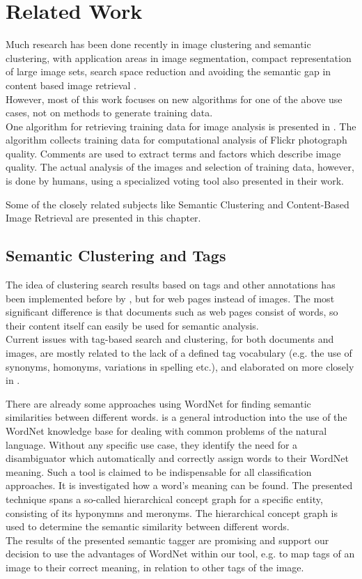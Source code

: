 \section{Related Work}
\label{sec_relatedwork}

Much research has been done recently in image clustering and semantic clustering, with application areas in image segmentation, compact representation of large image sets, search space reduction and avoiding the semantic gap in content based image retrieval \cite{Lim2011}. \\
However, most of this work focuses on new algorithms for one of the above use cases, not on methods to generate training data. \\

One algorithm for retrieving training data for image analysis is presented in \cite{Orendovici2010}. The algorithm collects training data for computational analysis of Flickr photograph quality. Comments are used to extract terms and factors which describe image quality. The actual analysis of the images and selection of training data, however, is done by humans, using a specialized voting tool also presented in their work.

\bigskip
Some of the closely related subjects like Semantic Clustering and Content-Based Image Retrieval are presented in this chapter.

\subsection{Semantic Clustering and Tags}
The idea of clustering search results based on tags and other annotations has been implemented before by \cite{Ramage2009}, but for web pages instead of images. The most significant difference is that documents such as web pages consist of words, so their content itself can easily be used for semantic analysis.\\
Current issues with tag-based search and clustering, for both documents and images, are mostly related to the lack of a defined tag vocabulary (e.g. the use of synonyms, homonyms, variations in spelling etc.), and elaborated on more closely in \cite{Auer2011}.

\bigskip
There are already some approaches using WordNet for finding semantic similarities between different words.  \cite{richardson1994using} is a general introduction into the use of the WordNet knowledge base for dealing with common problems of the natural language. Without any specific use case, they identify the need for a disambiguator which automatically and correctly assign words to their WordNet meaning. Such a tool is claimed to be indispensable for all classification approaches. It is investigated how a word's meaning can be found. The presented technique spans a so-called hierarchical concept graph for a specific entity, consisting of its hyponymns and meronyms. The hierarchical concept graph is used to determine the semantic similarity between different words. \\
The results of the presented semantic tagger are promising and support our decision to use the advantages of WordNet within our tool, e.g. to map tags of an image to their correct meaning, in relation to other tags of the image.

